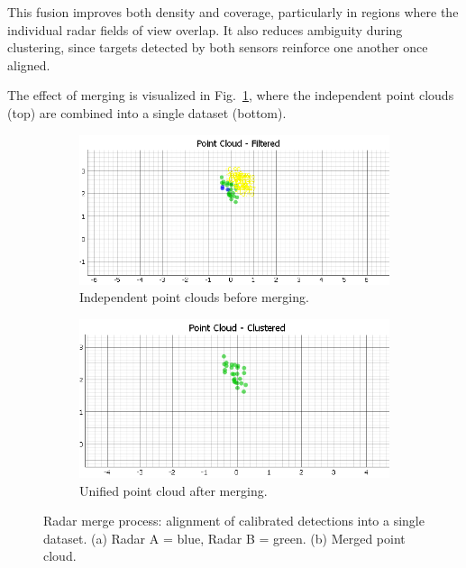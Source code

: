 This fusion improves both density and coverage, particularly in regions where the individual radar fields of view overlap.  
It also reduces ambiguity during clustering, since targets detected by both sensors reinforce one another once aligned.  

The effect of merging is visualized in Fig.~\ref{fig:radar_merge}, where the independent point clouds (top) are combined into a single dataset (bottom).  

\begin{figure}[!htbp]
    \centering
    \begin{subfigure}[t]{0.8\linewidth}
        \centering
        \includegraphics[width=\linewidth]{images/AFTERdualSensorCalib_2mts.png}
        \caption{Independent point clouds before merging.}
    \end{subfigure}
    \vfill
    \begin{subfigure}[t]{0.8\linewidth}
        \centering
        \includegraphics[width=\linewidth]{images/AFTERdualSensorCalibCluster_2mts.png}
        \caption{Unified point cloud after merging.}
    \end{subfigure}
    \caption{Radar merge process: alignment of calibrated detections into a single dataset. (a) Radar A = blue, Radar B = green. (b) Merged point cloud.}
    \label{fig:radar_merge}
\end{figure}
